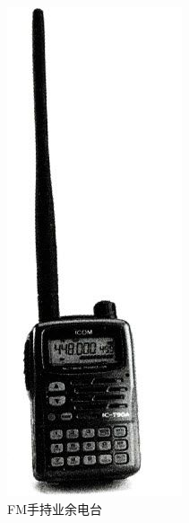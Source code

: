 \documentclass[12pt,UTF8]{ctexbook}
\begin{document}
\begin{figure}[htbp]
	\centering
	\includegraphics[width=0.7\linewidth]{19}
	\caption{FM手持业余电台}
	\label{fig:1}
\end{figure}
\end{document}
